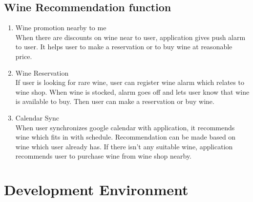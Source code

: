 \documentclass[conference]{IEEEtran}
\numberwithin{figure}{subsection}
\begin{document}
\subsection {\textbf{Wine Recommendation function}}
\begin{enumerate}
    \item Wine promotion nearby to me\\
    When there are discounts on wine near to user, application gives push alarm to user. It helps user to make a reservation or to buy wine at reasonable price.
    \item Wine Reservation\\
    If user is looking for rare wine, user can register wine alarm which relates to wine shop. When wine is stocked, alarm goes off and lets user know that wine is available to buy. Then user can make a reservation or buy wine.
    \item Calendar Sync\\
    When user synchronizes google calendar with application, it recommends wine which fits in with schedule. Recommendation can be made based on wine which user already has. If there isn't any suitable wine, application recommends user to purchase wine from wine shop nearby.
\end{enumerate}

\section{Development Environment}
\end{document}
